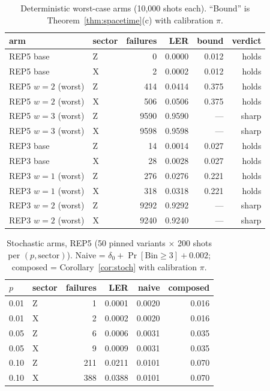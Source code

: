 \documentclass[10pt,twocolumn]{revtex4-2}
\begin{document}
\begin{table}[H]\centering\small
\caption{Deterministic worst-case arms (10{,}000 shots each).
``Bound'' is Theorem~\ref{thm:spacetime}(c) with calibration
$\pi$.}\label{tab:injdet}
\begin{tabular}{@{}llrrrr@{}}
\toprule
arm & sector & failures & LER & bound & verdict \\\midrule
REP5 base & Z & 0 & 0.0000 & 0.012 & holds \\
REP5 base & X & 2 & 0.0002 & 0.012 & holds \\
REP5 $w{=}2$ (worst) & Z & 414 & 0.0414 & 0.375 & holds \\
REP5 $w{=}2$ (worst) & X & 506 & 0.0506 & 0.375 & holds \\
REP5 $w{=}3$ (worst) & Z & 9590 & 0.9590 & --- & sharp \\
REP5 $w{=}3$ (worst) & X & 9598 & 0.9598 & --- & sharp \\
REP3 base & Z & 14 & 0.0014 & 0.027 & holds \\
REP3 base & X & 28 & 0.0028 & 0.027 & holds \\
REP3 $w{=}1$ (worst) & Z & 276 & 0.0276 & 0.221 & holds \\
REP3 $w{=}1$ (worst) & X & 318 & 0.0318 & 0.221 & holds \\
REP3 $w{=}2$ (worst) & Z & 9292 & 0.9292 & --- & sharp \\
REP3 $w{=}2$ (worst) & X & 9240 & 0.9240 & --- & sharp \\\bottomrule
\end{tabular}
\end{table}

\begin{table}[H]\centering\small
\caption{Stochastic arms, REP5 (50 pinned variants $\times$ 200 shots per
$(p,\text{sector})$). Naive = $\delta_0+\Pr[\mathrm{Bin}\ge3]+0.002$;
composed = Corollary~\ref{cor:stoch} with calibration
$\pi$.}\label{tab:injstoch}
\begin{tabular}{@{}llrrrr@{}}
\toprule
$p$ & sector & failures & LER & naive & composed \\\midrule
0.01 & Z & 1 & 0.0001 & 0.0020 & 0.016 \\
0.01 & X & 2 & 0.0002 & 0.0020 & 0.016 \\
0.05 & Z & 6 & 0.0006 & 0.0031 & 0.035 \\
0.05 & X & 9 & 0.0009 & 0.0031 & 0.035 \\
0.10 & Z & 211 & 0.0211 & 0.0101 & 0.070 \\
0.10 & X & 388 & 0.0388 & 0.0101 & 0.070 \\\bottomrule
\end{tabular}
\end{table}
\end{document}
